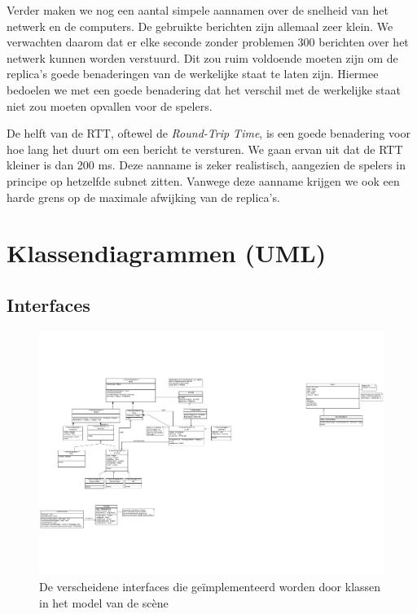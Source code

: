 \documentclass[a4paper,11pt]{article}
\begin{document}
    Verder maken we nog een aantal simpele aannamen over de snelheid van het netwerk en de computers. De gebruikte berichten zijn allemaal zeer klein. We verwachten daarom dat er elke seconde zonder problemen 300 berichten over het netwerk kunnen worden verstuurd. Dit zou ruim voldoende moeten zijn om de replica's goede benaderingen van de werkelijke staat te laten zijn. Hiermee bedoelen we met een goede benadering dat het verschil met de werkelijke staat niet zou moeten opvallen voor de spelers.

    De helft van de RTT, oftewel de \emph{Round-Trip Time}, is een goede benadering voor hoe lang het duurt om een bericht te versturen. We gaan ervan uit dat de RTT kleiner is dan 200 ms. Deze aanname is zeker realistisch, aangezien de spelers in principe op hetzelfde subnet zitten. Vanwege deze aanname krijgen we ook een harde grens op de maximale afwijking van de replica's.

    \label{sec:interactscenmodel}
    \newpage
    \appendix
    \section{Klassendiagrammen (UML)}
    \subsection{Interfaces}
    \begin{figure}[h]
    \centering
    	\includegraphics{../Class-diagram/Interfaces.pdf}
    	\caption{De verscheidene interfaces die ge\"implementeerd worden door klassen in het model van de sc\`ene}
    \end{figure}
    \label{app:Interfaces}
    \FloatBarrier
\end{document}
